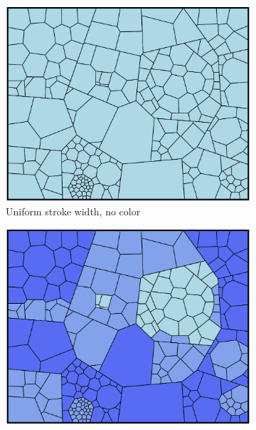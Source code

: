 \documentclass{acm_proc_article-sp} \usepackage{cite}
\begin{document}
\newlength{\comparelength}
\setlength{\comparelength}{0.3\textwidth}
\begin{figure}
        \centering
        \begin{subfigure}[b]{\comparelength}
                \includegraphics[width=\textwidth]{source-images/compare-nostroke-none-cropped.PNG}
                \caption{Uniform stroke width, no color}
        \end{subfigure}
        \qquad
        \begin{subfigure}[b]{\comparelength}
                \includegraphics[width=\textwidth]{source-images/compare-nostroke-linear-cropped.PNG}

\end{subfigure}
\end{figure}
\end{document}
